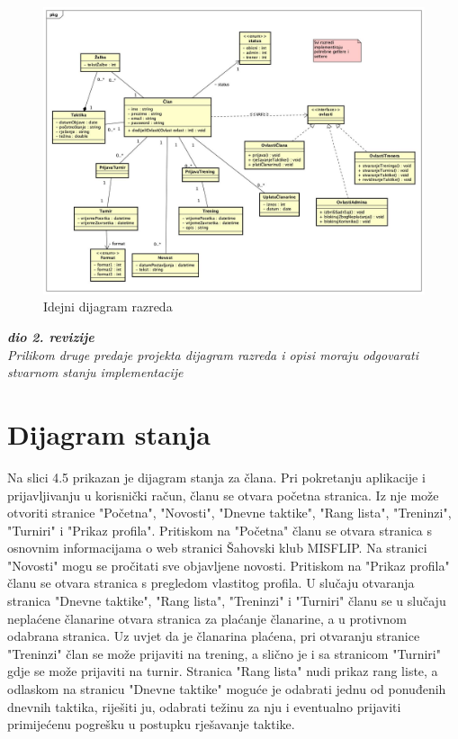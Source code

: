 			\eject
			
			\begin{figure}[H]
					\centerfloat
					\advance{}
        					\includegraphics[scale=0.35]{dijagrami/Classdiagram.jpg} %
        					\caption{Idejni dijagram razreda}
        					\label{fig:idejniDijagramRazreda}
				\end{figure}

			
			\textbf{\textit{dio 2. revizije}}\\			
			
			\textit{Prilikom druge predaje projekta dijagram razreda i opisi moraju odgovarati stvarnom stanju implementacije}
			
			
			
			\eject
		
		\section{Dijagram stanja}
			
			
			Na slici 4.5 prikazan je dijagram stanja za člana. Pri pokretanju aplikacije i prijavljivanju u korisnički račun, članu se otvara početna stranica. Iz nje može otvoriti stranice "Početna",  "Novosti", "Dnevne taktike", "Rang lista", "Treninzi", "Turniri" i "Prikaz profila". Pritiskom na "Početna" članu se otvara stranica s osnovnim informacijama o web stranici Šahovski klub MISFLIP. Na stranici "Novosti" mogu se pročitati sve objavljene novosti. Pritiskom na "Prikaz profila" članu se otvara stranica s pregledom vlastitog profila. U slučaju otvaranja stranica "Dnevne taktike", "Rang lista", "Treninzi" i "Turniri" članu se u slučaju neplaćene članarine otvara stranica za plaćanje članarine, a u protivnom odabrana stranica. Uz uvjet da je članarina plaćena, pri otvaranju stranice "Treninzi" član se može prijaviti na trening, a slično je i sa stranicom "Turniri" gdje se može prijaviti na turnir. Stranica "Rang lista" nudi prikaz rang liste, a odlaskom na stranicu "Dnevne taktike" moguće je odabrati jednu od ponuđenih dnevnih taktika, riješiti ju, odabrati težinu za nju i eventualno prijaviti primijećenu pogrešku u postupku rješavanje taktike.
				
